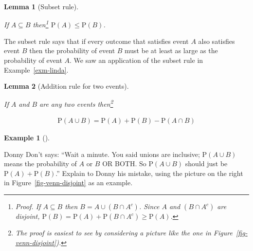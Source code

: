 \documentclass[
  letterpaper,
  DIV=11,
  numbers=noendperiod]{scrreprt}
\theoremstyle{plain}
\newtheorem{lemma}{Lemma}[chapter]
\theoremstyle{definition}
\newtheorem{example}{Example}[chapter]
\theoremstyle{definition}
\theoremstyle{definition}
\theoremstyle{remark}
\begin{document}
\begin{lemma}[Subset
rule]\protect\hypertarget{lem-subset-rule}{}\label{lem-subset-rule}

 If \(A \subseteq B\) then\footnote{\emph{Proof.} If
  \(A \subseteq B\) then \(B = A \cup (B \cap A^c)\). Since \(A\) and
  \((B \cap A^c)\) are disjoint,
  \(\textrm{P}(B) = \textrm{P}(A) + \textrm{P}(B \cap A^c) \ge \textrm{P}(A)\).}
\(\textrm{P}(A) \le \textrm{P}(B)\).

\end{lemma}

The subset rule says that if every outcome that satisfies event \(A\)
also satisfies event \(B\) then the probability of event \(B\) must be
at least as large as the probability of event \(A\). We saw an
application of the subset rule in Example~\ref{exm-linda}.

\begin{lemma}[Addition rule for two
events]\protect\hypertarget{lem-addition-rule}{}\label{lem-addition-rule}

If \(A\) and \(B\) are any two events then\footnote{The proof is easiest
  to see by considering a picture like the one in
  Figure~\ref{fig-venn-disjoint}).}

\end{lemma}

\begin{align*}
    \textrm{P}(A\cup B) = \textrm{P}(A) + \textrm{P}(B) - \textrm{P}(A \cap B)
\end{align*}

\begin{tcolorbox}[enhanced jigsaw, opacityback=0, left=2mm, colframe=quarto-callout-note-color-frame, toprule=.15mm, breakable, colback=white, leftrule=.75mm, arc=.35mm, rightrule=.15mm, bottomrule=.15mm]

\begin{example}[]\protect\hypertarget{exm-dd-union}{}\label{exm-dd-union}

Donny Don't says: ``Wait a minute. You said unions are inclusive;
\(\textrm{P}(A\cup B)\) means the probability of \(A\) or \(B\) OR BOTH.
So \(\textrm{P}(A\cup B)\) should just be
\(\textrm{P}(A)+\textrm{P}(B)\).'' Explain to Donny his mistake, using
the picture on the right in Figure~\ref{fig-venn-disjoint} as an
example.

\end{example}

\end{tcolorbox}
\end{document}
